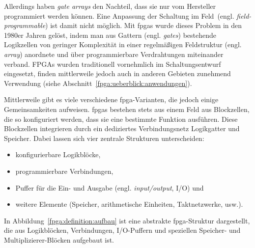 Allerdings haben \textit{gate arrays} den Nachteil, dass sie nur vom Hersteller
programmiert werden können. Eine Anpassung der Schaltung \glqq im Feld\grqq\
(engl. \textit{field-programmable}) ist damit nicht möglich. Mit
\gls{fpga}s wurde dieses Problem in den 1980er Jahren gelöst, indem man aus
Gattern (engl. \textit{gates}) bestehende Logikzellen von geringer Komplexität
in einer regelmäßigen Feldstruktur (engl. \textit{array}) anordnete und über
programmierbare Verdrahtungen miteinander verband. FPGAs wurden traditionell
vornehmlich im Schaltungsentwurf eingesetzt, finden mittlerweile jedoch auch in
anderen Gebieten zunehmend Verwendung (siehe
Abschnitt~\ref{fpga:ueberblick:anwendungen}).
\cite[vgl.][208]{kesel2013} 

Mittlerweile gibt es viele verschiedene \gls{fpga}-Varianten, die jedoch einige
Gemeinsamkeiten aufweisen. \gls{fpga}s bestehen stets aus einem Feld aus
Blockzellen, die so konfiguriert werden, dass sie eine bestimmte Funktion
ausführen. Diese Blockzellen integrieren durch ein dediziertes Verbindungsnetz
Logikgatter und Speicher. Dabei lassen sich vier zentrale Strukturen
unterscheiden:
\begin{itemize}
    \item konfigurierbare Logikblöcke,
    \item programmierbare Verbindungen,
    \item Puffer für die Ein- und Ausgabe (engl. \textit{input/output}, I/O) und
    \item weitere Elemente (Speicher, arithmetische Einheiten, Taktnetzwerke,
          usw.).
\end{itemize}
In Abbildung~\ref{fpga:definition:aufbau} ist eine abstrakte \gls{fpga}-Struktur
dargestellt, die aus Logikblöcken, Verbindungen, I/O-Puffern und speziellen
Speicher- und Multiplizierer-Blöcken aufgebaut ist.
\cite[vgl.][10-13--10-14]{hawkins2010}

